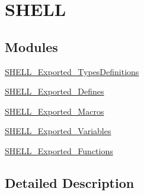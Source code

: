 \hypertarget{group___s_h_e_l_l}{}\section{S\+H\+E\+LL}
\label{group___s_h_e_l_l}
\subsection*{Modules}
\begin{DoxyCompactItemize}
\item 
\mbox{\hyperlink{group___s_h_e_l_l___exported___types_definitions}{S\+H\+E\+L\+L\+\_\+\+Exported\+\_\+\+Types\+Definitions}}
\item 
\mbox{\hyperlink{group___s_h_e_l_l___exported___defines}{S\+H\+E\+L\+L\+\_\+\+Exported\+\_\+\+Defines}}
\item 
\mbox{\hyperlink{group___s_h_e_l_l___exported___macros}{S\+H\+E\+L\+L\+\_\+\+Exported\+\_\+\+Macros}}
\item 
\mbox{\hyperlink{group___s_h_e_l_l___exported___variables}{S\+H\+E\+L\+L\+\_\+\+Exported\+\_\+\+Variables}}
\item 
\mbox{\hyperlink{group___s_h_e_l_l___exported___functions}{S\+H\+E\+L\+L\+\_\+\+Exported\+\_\+\+Functions}}
\end{DoxyCompactItemize}


\subsection{Detailed Description}
